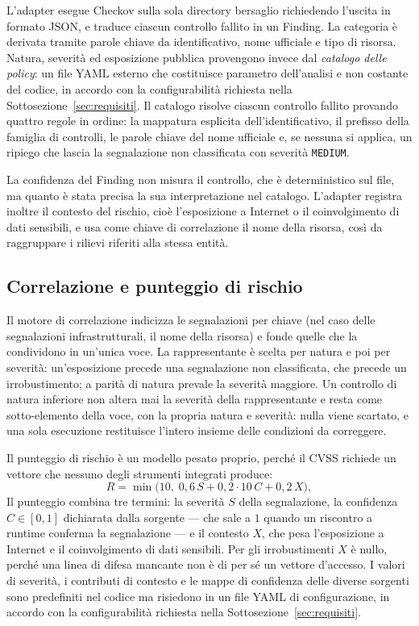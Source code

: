 L'adapter esegue Checkov sulla sola directory bersaglio richiedendo l'uscita
in formato JSON, e traduce ciascun controllo fallito in un Finding. La categoria è derivata tramite parole chiave
da identificativo, nome ufficiale e tipo di risorsa. Natura, severità ed
esposizione pubblica provengono invece dal \emph{catalogo delle policy}: un file
YAML esterno che costituisce parametro dell'analisi e non costante del codice,
in accordo con la configurabilità richiesta nella
Sottosezione~\ref{sec:requisiti}. Il catalogo risolve ciascun controllo
fallito provando quattro regole in ordine: la mappatura esplicita
dell'identificativo, il prefisso della famiglia di controlli, le parole chiave
del nome ufficiale e, se nessuna si applica, un ripiego che lascia la
segnalazione non classificata con severità \texttt{MEDIUM}.

La confidenza del Finding non misura il controllo, che è deterministico sul
file, ma quanto è stata precisa la sua interpretazione nel catalogo. L'adapter
registra inoltre il contesto del rischio, cioè l'esposizione a Internet o il
coinvolgimento di dati sensibili, e usa come chiave di correlazione il nome
della risorsa, così da raggruppare i rilievi riferiti alla stessa entità.

\subsection{Correlazione e punteggio di rischio}
\label{sec:correlazione}

Il motore di correlazione indicizza le segnalazioni per chiave (nel caso delle
segnalazioni infrastrutturali, il nome della risorsa) e fonde quelle che la
condividono in un'unica voce. La rappresentante è scelta per natura e poi
per severità: un'esposizione precede una segnalazione non classificata, che
precede un irrobustimento; a parità di natura prevale la severità maggiore.
Un controllo di natura inferiore non altera mai la severità della
rappresentante e resta come sotto-elemento della voce, con la propria natura
e severità: nulla viene scartato, e una sola esecuzione restituisce l'intero
insieme delle condizioni da correggere.

Il punteggio di rischio è un modello pesato proprio, perché il CVSS richiede
un vettore che nessuno degli strumenti integrati produce:
\begin{equation}
  R = \min\bigl(10,\; 0{,}6\,S + 0{,}2 \cdot 10\,C + 0{,}2\,X\bigr),
  \label{eq:risk-score}
\end{equation}
Il punteggio combina tre termini: la severità $S$ della segnalazione, la
confidenza $C \in [0,1]$ dichiarata dalla sorgente --- che sale a $1$ quando un
riscontro a runtime conferma la segnalazione --- e il contesto $X$, che pesa
l'esposizione a Internet e il coinvolgimento di dati sensibili. Per gli
irrobustimenti $X$ è nullo, perché una linea di difesa mancante non è di per sé
un vettore d'accesso. I valori di severità, i contributi di contesto e le mappe
di confidenza delle diverse sorgenti sono predefiniti nel codice ma risiedono
in un file YAML di configurazione, in accordo con la configurabilità richiesta
nella Sottosezione~\ref{sec:requisiti}.

